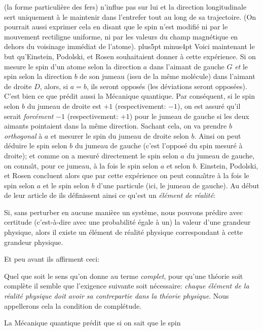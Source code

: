 (la forme particuli\`ere des fers) n'influe pas sur lui et la direction 
longitudinale sert uniquement \`a le maintenir dans l'entrefer tout au  
long de sa trajectoire. (On pourrait aussi exprimer cela en disant que le 
spin n'est modifi\'e ni par le mouvement rectiligne uniforme, ni par les 
valeurs du champ magn\'etique en dehors du voisinage imm\'ediat de 
l'atome).  
\vskip6pt plus5pt minus4pt 
Voici maintenant le but qu'Einstein, Podolski, et Rosen souhaitaient 
donner \`a cette exp\'erience. Si on mesure le spin d'un atome 
selon la direction $a$ dans l'aimant de gauche $G$ {\it et} le spin 
selon la direction $b$ de son jumeau (issu de la m\^eme 
mol\'ecule)  dans l'aimant de droite $D$, alors, si $a = b$, ils seront 
oppos\'es (les d\'eviations seront oppos\'ees). C'est bien ce que pr\'edit 
aussi la M\'ecanique quantique.  Par cons\'equent, si le spin selon $b$ du 
jumeau de droite est $+1$ (respectivement: $-1$), on est assur\'e qu'il
serait {\it forc\'ement} $-1$ (respectivement: $+1$) pour le jumeau de gauche
si les deux aimants pointaient dans la m\^eme direction. 
Sachant cela, on va prendre $b$ {\it orthogonal} \`a $a$ et mesurer le spin
du jumeau de droite selon $b$. Ainsi on peut d\'eduire le spin selon $b$ du
jumeau de gauche (c'est l'oppos\'e du spin mesur\'e \`a droite);  et comme
on a mesur\'e directement le spin selon $a$ du jumeau de gauche,  on
conna{\^\i}t,  pour ce jumeau,  \`a la fois le spin selon $a$ et selon $b$. 
Einstein,  Podolski,  et Rosen concluent alors que par cette exp\'erience
on peut conna{\^\i}tre \`a la fois le spin selon $a$ et le spin selon $b$
d'une particule (ici,  le jumeau de gauche).  
\medskip
Au d\'ebut de leur article de {} ils d\'efinissent ainsi
ce qu'est un {\it \'el\'ement de r\'ealit\'e}:
\smallskip
{\cit Si,  sans perturber en aucune mani\`ere un syst\`eme, 
nous pouvons pr\'edire avec certitude (c'est-\`a-dire avec une
probabilit\'e \'egale \`a un) la valeur d'une grandeur physique, 
alors il existe un \'el\'ement de r\'ealit\'e physique correspondant
\`a cette grandeur physique. \par}
\medskip
Et peu avant ils affirment ceci:
\smallskip
{\cit Quel que soit le sens qu'on donne au terme {\it complet}, 
pour qu'une th\'eorie soit compl\`ete il semble que l'exigence
suivante soit n\'ecessaire: {\it chaque \'el\'ement de la r\'ealit\'e
physique doit avoir sa contrepartie dans la th\'eorie physique}. 
Nous appellerons cela la condition de compl\'etude. \par}
\medskip
La M\'ecanique quantique pr\'edit que si on sait que le spin

